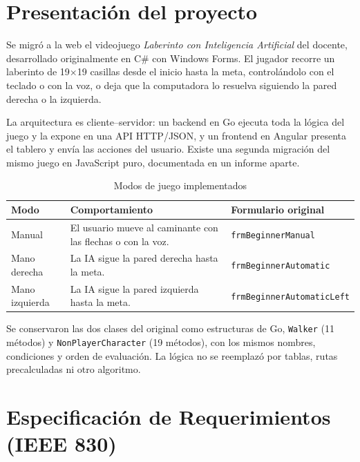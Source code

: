 \documentclass[12pt,a4paper]{article}
\begin{document}
\section{Presentación del proyecto}
Se migró a la web el videojuego \emph{Laberinto con Inteligencia Artificial} del
docente, desarrollado originalmente en C\# con Windows Forms. El jugador recorre
un laberinto de 19$\times$19 casillas desde el inicio hasta la meta, controlándolo
con el teclado o con la voz, o deja que la computadora lo resuelva siguiendo la
pared derecha o la izquierda.

La arquitectura es cliente--servidor: un backend en Go ejecuta toda la lógica del
juego y la expone en una API HTTP/JSON, y un frontend en Angular presenta el
tablero y envía las acciones del usuario. Existe una segunda migración del mismo
juego en JavaScript puro, documentada en un informe aparte.

\begin{table}[H]
\centering
\caption{Modos de juego implementados}
\begin{tabular}{p{2.8cm}p{5cm}p{5.6cm}}
\toprule
\textbf{Modo} & \textbf{Comportamiento} & \textbf{Formulario original}\\
\midrule
Manual & El usuario mueve al caminante con las flechas o con la voz. & \texttt{frmBeginnerManual}\\
Mano derecha & La IA sigue la pared derecha hasta la meta. & \texttt{frmBeginnerAutomatic}\\
Mano izquierda & La IA sigue la pared izquierda hasta la meta. & \texttt{frmBeginnerAutomaticLeft}\\
\bottomrule
\end{tabular}
\end{table}

Se conservaron las dos clases del original como estructuras de Go,
\texttt{Walker} (11 métodos) y \texttt{NonPlayerCharacter} (19 métodos), con los
mismos nombres, condiciones y orden de evaluación. La lógica no se reemplazó por
tablas, rutas precalculadas ni otro algoritmo.

\section{Especificación de Requerimientos (IEEE 830)}
\end{document}
